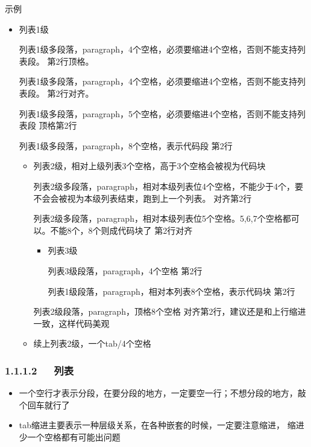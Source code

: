 \documentclass[letterpaper,12pt,english]{sphinxmanual}
\begin{document}
示例
\begin{itemize}
\item {} 
列表1级

列表1级多段落，paragraph，4个空格，必须要缩进4个空格，否则不能支持列表段。
第2行顶格。

列表1级多段落，paragraph，4个空格，必须要缩进4个空格，否则不能支持列表段。
第2行对齐。

列表1级多段落，paragraph，5个空格，必须要缩进4个空格，否则不能支持列表段
顶格第2行

\begin{sphinxVerbatim}[commandchars=\\\{\}]
列表1级多段落，paragraph，8个空格，表示代码段
第2行
\end{sphinxVerbatim}
\begin{itemize}
\item {} 
列表2级，相对上级列表3个空格，高于3个空格会被视为代码块

列表2级多段落，paragraph，相对本级列表位4个空格，不能少于4个，要不会会被视为本级列表结束，跑到上一个列表。
对齐第2行

列表2级多段落，paragraph，相对本级列表位5个空格。5,6,7个空格都可以。不能8个，8个则成代码块了
第2行对齐
\begin{itemize}
\item {} 
列表3级

列表3级段落，paragraph，4个空格 第2行

\begin{sphinxVerbatim}[commandchars=\\\{\}]
列表1级段落，paragraph，相对本列表8个空格，表示代码块
第2行
\end{sphinxVerbatim}

\end{itemize}

列表2级段落，paragraph，顶格8个空格
对齐第2行，建议还是和上行缩进一致，这样代码美观

\item {} 
续上列表2级，一个tab/4个空格

\end{itemize}

\end{itemize}


\subsubsection{1.1.1.2   列表}
\label{\detokenize{001software/001install/001._u7f51_u7ad9/demo-markdown:id4}}\begin{itemize}
\item {} 
一个空行才表示分段，在要分段的地方，一定要空一行；不想分段的地方，敲个回车就行了

\item {} 
tab缩进主要表示一种层级关系，在各种嵌套的时候，一定要注意缩进，
缩进少一个空格都有可能出问题

\end{itemize}
\end{document}
